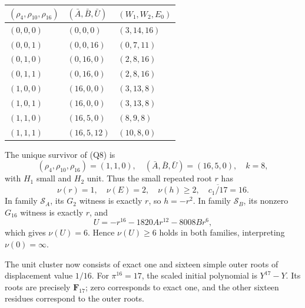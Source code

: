 \documentclass[
  british,
  10pt,
  a4paper,
]{article}
\newcounter{none} %
\begin{document}
{\def\LTcaptype{none} %
\begin{longtable}[]{@{}
  >{\raggedright\arraybackslash}p{}
  >{\raggedright\arraybackslash}p{}
  >{\raggedright\arraybackslash}p{}@{}}
\toprule\noalign{}
\begin{minipage}[b]{\linewidth}\raggedright
\((\rho_4,\rho_{10},\rho_{16})\)
\end{minipage} & \begin{minipage}[b]{\linewidth}\raggedright
\((\bar A,\bar B,\bar U)\)
\end{minipage} & \begin{minipage}[b]{\linewidth}\raggedright
\((W_1,W_2,E_0)\)
\end{minipage} \\
\midrule\noalign{}
\endhead
\bottomrule\noalign{}
\endlastfoot
\((0,0,0)\) & \((0,0,0)\) & \((3,14,16)\) \\
\((0,0,1)\) & \((0,0,16)\) & \((0,7,11)\) \\
\((0,1,0)\) & \((0,16,0)\) & \((2,8,16)\) \\
\((0,1,1)\) & \((0,16,0)\) & \((2,8,16)\) \\
\((1,0,0)\) & \((16,0,0)\) & \((3,13,8)\) \\
\((1,0,1)\) & \((16,0,0)\) & \((3,13,8)\) \\
\((1,1,0)\) & \((16,5,0)\) & \((8,9,8)\) \\
\((1,1,1)\) & \((16,5,12)\) & \((10,8,0)\) \\
\end{longtable}
}

The unique survivor of (Q8) is \[
(\rho_4,\rho_{10},\rho_{16})=(1,1,0),\quad
(\bar A,\bar B,\bar U)=(16,5,0),\quad k=8,
\] with \(H_1\) small and \(H_2\) unit. Thus the small repeated root
\(r\) has \[
\nu(r)=1,\quad \nu(E)=2,\quad \nu(h)\geq2,\quad
\overline{c_1/17}=16. \tag{Q9}
\] In family \(\mathcal S_A\), its \(G_2\) witness is exactly \(r\), so
\(h=-r^2\). In family \(\mathcal S_B\), its nonzero \(G_{16}\) witness
is exactly \(r\), and \[
U=-r^{16}-1820Ar^{12}-8008Br^6,
\] which gives \(\nu(U)=6\). Hence \(\nu(U)\geq6\) holds in both
families, interpreting \(\nu(0)=\infty\).

The unit cluster now consists of exact one and sixteen simple outer
roots of displacement value \(1/16\). For \(\pi^{16}=17\), the scaled
initial polynomial is \(Y^{17}-Y\). Its roots are precisely
\(\mathbf F_{17}\); zero corresponds to exact one, and the other sixteen
residues correspond to the outer roots.
\end{document}
